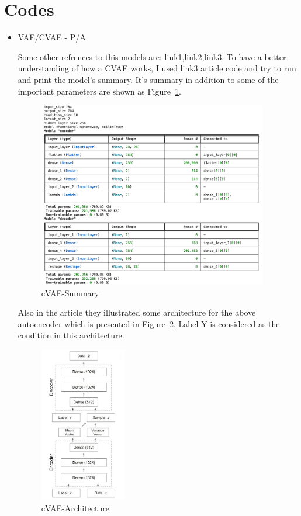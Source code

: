 \documentclass{article}
\begin{document}
\section{Codes}\label{sec:Codes}
\begin{itemize}
\item VAE/CVAE  - P/A

Some other refrences to this models are: \href{https://colab.research.google.com/github/lschmiddey/fastpages_/blob/master/_notebooks/2021-03-14-tabular-data-variational-autoencoder.ipynb#scrollTo=U70AsP_Cgf3v}{link1},\href{https://github.com/sfme/RVAE_MixedTypes}{link2},\href{https://github.com/unnir/cVAE}{link3}. To have a better understanding of how a CVAE works, I used \href{https://www.analyticsvidhya.com/blog/2023/09/generative-ai-conditional-vaes/}{link3} article code and try to run and print the model's summary. It's summary in addition to some of the important parameters are shown as Figure~\ref{cVAE-Summary}.
\begin{figure}
    \centering
    \includegraphics[width=10cm]{Summary1.png}
    \caption{cVAE-Summary}
    \label{cVAE-Summary}
\end{figure}



Also in the article they illustrated some architecture for the above autoencoder which is presented in Figure~\ref{cVAE-Architecture}. Label Y is considered as the condition in this architecture.
\begin{figure}
    \centering
    \includegraphics[width=3.8cm]{Architecture1.png}
    \caption{cVAE-Architecture}
    \label{cVAE-Architecture}
\end{figure}



\end{itemize}
\end{document}
